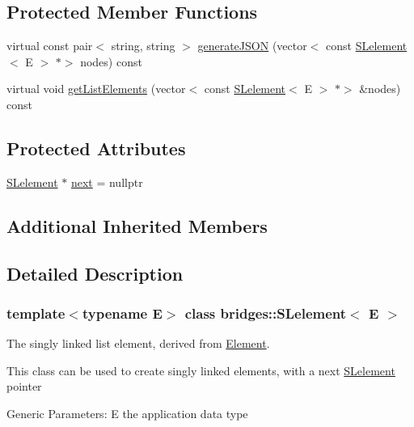 \subsection*{Protected Member Functions}
\begin{DoxyCompactItemize}
\item 
virtual const pair$<$ string, string $>$ \mbox{\hyperlink{classbridges_1_1_s_lelement_af154fd3038c46e53fe28cf65ab528ca9}{generate\+J\+S\+ON}} (vector$<$ const \mbox{\hyperlink{classbridges_1_1_s_lelement}{S\+Lelement}}$<$ E $>$ $\ast$$>$ nodes) const
\item 
virtual void \mbox{\hyperlink{classbridges_1_1_s_lelement_a954395391ee5cfe3a64b9f7aca4b3b21}{get\+List\+Elements}} (vector$<$ const \mbox{\hyperlink{classbridges_1_1_s_lelement}{S\+Lelement}}$<$ E $>$ $\ast$$>$ \&nodes) const
\end{DoxyCompactItemize}
\subsection*{Protected Attributes}
\begin{DoxyCompactItemize}
\item 
\mbox{\hyperlink{classbridges_1_1_s_lelement}{S\+Lelement}} $\ast$ \mbox{\hyperlink{classbridges_1_1_s_lelement_ad7449d10a09ebc52653a7baed812aa43}{next}} = nullptr
\end{DoxyCompactItemize}
\subsection*{Additional Inherited Members}


\subsection{Detailed Description}
\subsubsection*{template$<$typename E$>$\newline
class bridges\+::\+S\+Lelement$<$ E $>$}

The singly linked list element, derived from \mbox{\hyperlink{classbridges_1_1_element}{Element}}. 

This class can be used to create singly linked elements, with a next \mbox{\hyperlink{classbridges_1_1_s_lelement}{S\+Lelement}} pointer

Generic Parameters\+: E the application data type

